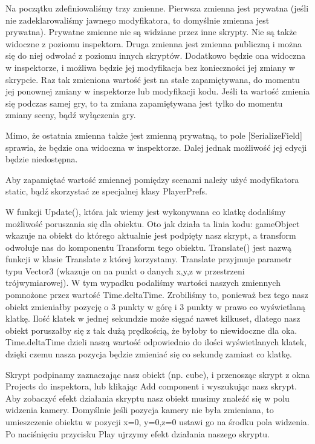 \documentclass[openright]{xmgr}
\begin{document}
Na początku zdefiniowaliśmy trzy zmienne. Pierwsza zmienna jest prywatna (jeśli nie zadeklarowaliśmy jawnego modyfikatora, to domyślnie zmienna jest prywatna). Prywatne zmienne nie są widziane przez inne skrypty. Nie są także widoczne z poziomu inspektora. Druga zmienna jest zmienna publiczną i można się do niej odwołać z poziomu innych skryptów. Dodatkowo będzie ona widoczna w inspektorze, i możliwa będzie jej modyfikacja bez konieczności jej zmiany w skrypcie. Raz tak zmieniona wartość jest na stałe zapamiętywana, do momentu jej ponownej zmiany w inspektorze lub modyfikacji kodu. Jeśli ta wartość zmienia się podczas samej gry, to ta zmiana zapamiętywana jest tylko do momentu zmiany sceny, bądź wyłączenia gry.

Mimo, że ostatnia zmienna także jest zmienną prywatną, to pole [SerializeField] sprawia, że będzie ona widoczna w inspektorze. Dalej jednak możliwość jej edycji będzie niedostępna.

Aby zapamiętać wartość zmiennej pomiędzy scenami należy użyć modyfikatora static, bądź skorzystać ze specjalnej klasy PlayerPrefs.

W funkcji Update(), która jak wiemy jest wykonywana co klatkę dodaliśmy możliwość poruszania się dla obiektu. Oto jak działa ta linia kodu: gameObject wkazuje na obiekt do którego aktualnie jest podpięty nasz skrypt, a transform odwołuje nas do komponentu Transform tego obiektu. Translate() jest nazwą funkcji w klasie Translate z której korzystamy. Translate przyjmuje parametr typu Vector3 (wkazuje on na punkt o danych x,y,z w przestrzeni trójwymiarowej). W tym wypadku podaliśmy wartości naszych zmiennych pomnożone przez wartość Time.deltaTime. Zrobiliśmy to, ponieważ bez tego nasz obiekt zmieniałby pozycję o 3 punkty w górę i 3 punkty w prawo co wyświetlaną klatkę. Ilość klatek w jednej sekundzie może sięgać nawet kilkuset, dlatego nasz obiekt poruszałby się z tak dużą prędkością, że byłoby to niewidoczne dla oka. Time.deltaTime dzieli naszą wartość odpowiednio do ilości wyświetlanych  klatek, dzięki czemu nasza pozycja będzie zmieniać się co sekundę zamiast co klatkę.

Skrypt podpinamy zaznaczając nasz obiekt (np. cube), i przenosząc skrypt z okna Projects do inspektora, lub klikając Add component i wyszukując nasz skrypt. Aby zobaczyć efekt działania skryptu nasz obiekt musimy znaleźć się w polu widzenia kamery. Domyślnie jeśli pozycja kamery nie była zmieniana, to umieszczenie obiektu w pozycji x=0, y=0,z=0 ustawi go na środku pola widzenia. Po naciśnięciu przycisku Play ujrzymy efekt działania naszego skryptu.
\end{document}

